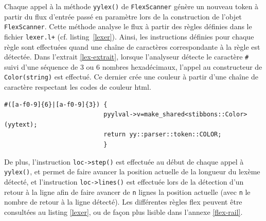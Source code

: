 Chaque appel à la méthode \verb|yylex()| de \verb|FlexScanner| génère un nouveau token à partir du flux d'entrée passé en paramètre lors de la construction de l'objet \verb|FlexScanner|. Cette méthode analyse le flux à partir des règles définies dans le fichier \verb|lexer.l+| (cf. listing~\ref{lexer}). Ainsi, les instructions définies pour chaque règle sont effectuées quand une chaîne de caractères correspondante à la règle est détectée. Dans l'extrait \ref{lex-extrait}, lorsque l'analyseur détecte le caractère \verb|#| suivi d'une séquence de 3 ou 6 nombres hexadécimaux, l'appel au constructeur de \verb|Color(string)| est effectué. Ce dernier crée une couleur à partir d'une chaîne de caractère respectant les codes de couleur html.

\begin{lstlisting}[label=lex-extrait,caption=Exemple de séquence d'instructions lors de la détection d'une couleur]
#([a-f0-9]{6}|[a-f0-9]{3}) {
                           pyylval->v=make_shared<stibbons::Color>(yytext);
                           return yy::parser::token::COLOR;
                           }
\end{lstlisting}

De plus, l'instruction \verb|loc->step()| est effectuée au début de chaque appel à \verb|yylex()|, et permet de faire avancer la position actuelle de la longueur du lexème détecté, et l'instruction \verb|loc->lines()| est effectuée lors de la détection d'un retour à la ligne afin de faire avancer de \verb|n| lignes la position actuelle (avec \verb|n| le nombre de retour à la ligne détecté).
Les différentes règles flex peuvent être consultées au listing \ref{lexer}, ou de façon plus lisible dans l'annexe \ref{flex-rail}.
